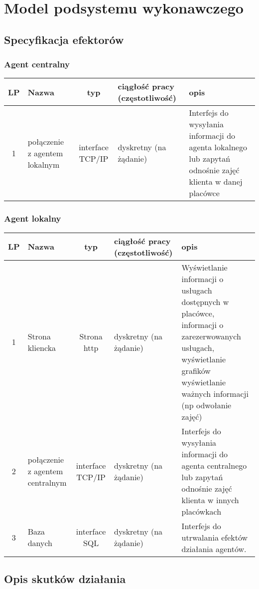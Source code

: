 \section{Model podsystemu wykonawczego}
\subsection{Specyfikacja efektorów}

\subsubsection{Agent centralny}

\begin{tabular}{c|p{3cm}|c|p{2cm}|p{4cm}}
LP		& Nazwa			& typ			& ciągłość pracy (częstotliwość) & opis \\
\hline
1		& połączenie z agentem lokalnym	& interface TCP/IP	& dyskretny (na żądanie) & Interfejs do wysyłania informacji do agenta lokalnego lub zapytań odnośnie zajęć klienta w danej placówce \\
\end{tabular}

\subsubsection{Agent lokalny}

\begin{tabular}{c|p{3cm}|c|p{2cm}|p{4cm}}
LP		& Nazwa			& typ		& ciągłość pracy (częstotliwość)	& opis \\
\hline
1		& Strona kliencka		& Strona http	& dyskretny (na żądanie)	& Wyświetlanie informacji o usługach dostępnych w placówce, informacji o zarezerwowanych usługach, wyświetlanie grafików wyświetlanie ważnych informacji (np odwołanie zajęć)\\
2		& połączenie z agentem centralnym		& interface TCP/IP & dyskretny (na żądanie)	& Interfejs do wysyłania informacji do agenta centralnego lub zapytań odnośnie zajęć klienta w innych placówkach \\
3		& Baza danych		& interface SQL	& dyskretny (na żądanie) & Interfejs do utrwalania efektów działania agentów.
\end{tabular}



\subsection{Opis skutków działania}

